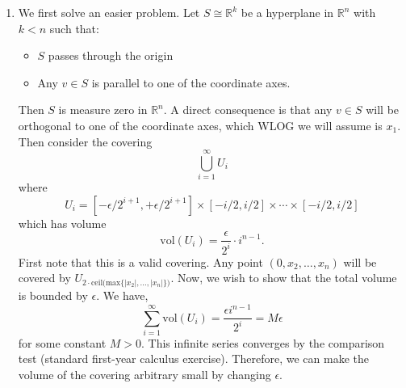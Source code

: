 \documentclass{article}
\numberwithin{equation}{section}
\begin{document}
\begin{enumerate}
\begin{enumerate}[label=(\alph*)]
        \item We first solve an easier problem. Let $S \cong \mathbb{R}^k$ be a hyperplane in $\mathbb{R}^n$ with $k < n$ such that:
        \begin{itemize}
            \item $S$ passes through the origin
            \item Any $v\in S$ is parallel to one of the coordinate axes.
        \end{itemize} 
        Then $S$ is measure zero in $\mathbb{R}^n.$ A direct consequence is that any $v\in S$ will be orthogonal to one of the coordinate axes, which WLOG we will assume is $x_1.$ Then consider the covering
        \begin{equation}
            \bigcup_{i=1}^{\infty} U_i
        \end{equation}
        where 
        \begin{equation}
            U_i = [-\epsilon/2^{i+1}, +\epsilon/2^{i+1}] \times [-i/2,i/2] \times \cdots \times [-i/2,i/2]
        \end{equation}
        which has volume 
        \begin{equation}
            \text{vol}(U_i) = \frac{\epsilon}{2^i} \cdot i^{n-1}.
        \end{equation}
        First note that this is a valid covering. Any point $(0, x_2, \dots, x_n)$ will be covered by $U_{2\cdot \text{ceil(}\text{max}\{|x_2|,\dots,|x_n|\})}.$
        Now, we wish to show that the total volume is bounded by $\epsilon.$ We have,
        \begin{equation}
            \sum_{i=1}^{\infty}\text{vol}(U_i) = \frac{\epsilon i^{n-1}}{2^i} = M\epsilon
        \end{equation}
        for some constant $M>0.$ This infinite series converges by the comparison test (standard first-year calculus exercise). Therefore, we can make the volume of the covering arbitrary small by changing $\epsilon.$


\end{enumerate}
\end{enumerate}
\end{document}
